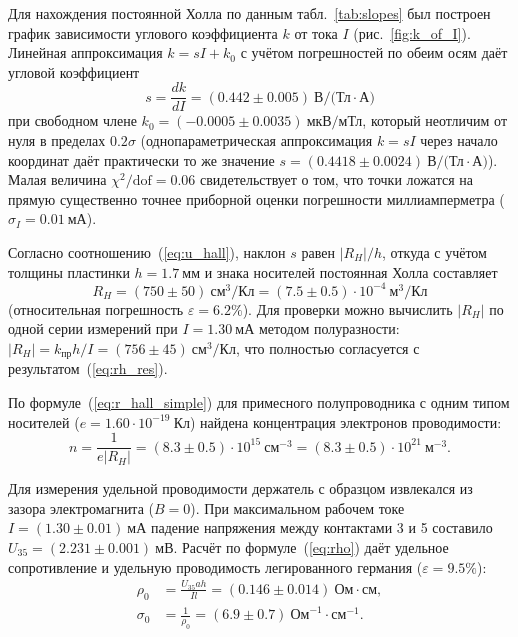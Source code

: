 \documentclass[reprint, amsmath, amssymb, aps, pra, nofootinbib]{revtex4-2}
\begin{document}
Для нахождения постоянной Холла по данным табл.~\ref{tab:slopes} был построен график зависимости углового коэффициента $k$ от тока $I$ (рис.~\ref{fig:k_of_I}).
Линейная аппроксимация $k = s I + k_0$ с учётом погрешностей по обеим осям даёт угловой коэффициент
\begin{equation}
s = \frac{dk}{dI} = (0.442 \pm 0.005)~\text{В/(Тл}\cdot\text{А)}
\label{eq:slope_s}
\end{equation}
при свободном члене $k_0 = (-0.0005 \pm 0.0035)~\text{мкВ/мТл}$, который неотличим от нуля в пределах $0.2\sigma$ (однопараметрическая аппроксимация $k = s I$ через начало координат даёт практически то же значение $s = (0.4418 \pm 0.0024)~\text{В/(Тл}\cdot\text{А)}$).
Малая величина $\chi^2/\text{dof} = 0.06$ свидетельствует о том, что точки ложатся на прямую существенно точнее приборной оценки погрешности миллиамперметра ($\sigma_I = 0.01~\text{мА}$). 

Согласно соотношению~(\ref{eq:u_hall}), наклон $s$ равен $|R_H|/h$, откуда с учётом толщины пластинки $h = 1.7~\text{мм}$ и знака носителей постоянная Холла составляет
\begin{equation}
R_H = (750 \pm 50)~\text{см}^3/\text{Кл} = (7.5 \pm 0.5)\cdot 10^{-4}~\text{м}^3/\text{Кл}
\label{eq:rh_res}
\end{equation}
(относительная погрешность $\varepsilon = 6.2\%$). 
Для проверки можно вычислить $|R_H|$ по одной серии измерений при $I = 1.30~\text{мА}$ методом полуразности: $|R_H| = k_{\text{пр}} h / I = (756 \pm 45)~\text{см}^3/\text{Кл}$, что полностью согласуется с результатом~(\ref{eq:rh_res}). 

По формуле~(\ref{eq:r_hall_simple}) для примесного полупроводника с одним типом носителей ($e = 1.60 \cdot 10^{-19}~\text{Кл}$) найдена концентрация электронов проводимости:
\begin{equation}
n = \frac{1}{e |R_H|} = (8.3 \pm 0.5)\cdot 10^{15}~\text{см}^{-3} = (8.3 \pm 0.5)\cdot 10^{21}~\text{м}^{-3}.
\label{eq:n_res}
\end{equation}

Для измерения удельной проводимости держатель с образцом извлекался из зазора электромагнита ($B = 0$).
При максимальном рабочем токе $I = (1.30 \pm 0.01)~\text{мА}$ падение напряжения между контактами 3 и 5 составило $U_{35} = (2.231 \pm 0.001)~\text{мВ}$.
Расчёт по формуле~(\ref{eq:rho}) даёт удельное сопротивление и удельную проводимость легированного германия ($\varepsilon = 9.5\%$):
\begin{align}
\rho_0 &= \frac{U_{35} a h}{I l} = (0.146 \pm 0.014)~\text{Ом}\cdot\text{см}, \label{eq:rho_res} \\
\sigma_0 &= \frac{1}{\rho_0} = (6.9 \pm 0.7)~\text{Ом}^{-1}\cdot\text{см}^{-1}. \label{eq:sigma_res}
\end{align}
\end{document}

